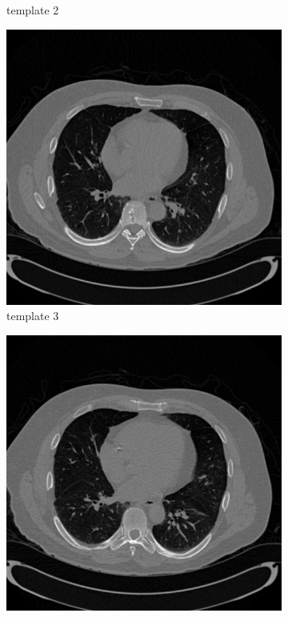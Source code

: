 \documentclass{article}
\begin{document}
\begin{figure}[h]
\begin{subfigure}[b]{0.3\linewidth}
        \caption{template 2}
     \end{subfigure}
    \begin{subfigure}[b]{0.3\linewidth}
        \includegraphics[width=\textwidth]{../images/supplementary/colon/template3.png}
        \caption{template 3}
     \end{subfigure}
    \begin{subfigure}[b]{0.3\linewidth}
        \includegraphics[width=\textwidth]{../images/supplementary/colon/template4.png}

\end{subfigure}
\end{figure}
\end{document}
